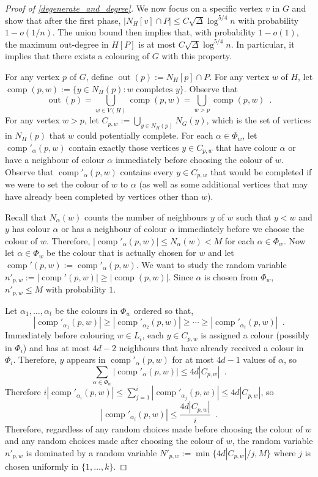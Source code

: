 \documentclass{patmorin}
\DeclareMathOperator{\outn}{out}
\DeclareMathOperator{\comp}{comp}
\begin{document}
\begin{proof}[Proof of \cref{degenerate_and_degree}]
  We now focus on a specific vertex $v$ in $G$ and show that after the first phase, $|N_{H}[v]\cap P|\le C\sqrt{\Delta}\log^{5/4} n$ with probability $1-o(1/n)$.  The union bound then implies that, with probability $1-o(1)$, the maximum out-degree in $H[P]$ is at most $C\sqrt{\Delta}\log^{5/4} n$.  In particular, it implies that there exists a colouring of $G$ with this property.

  For any vertex $p$ of $G$, define $\outn(p):=N_{H}[p]\cap P$. For any vertex $w$ of $H$, let $\comp(p,w):=\{y\in N_{H}(p):\text{$w$ completes $y$}\}$.  Observe that
  \[
    \outn(p) = \bigcup_{w\in V(H)} \comp(p,w) = \bigcup_{w>p} \comp(p,w) \enspace .
  \]
  For any vertex $w>p$, let $C_{p,w}:=\bigcup_{y\in N_{H}(p)} N_{G}(y)$, which is the set of vertices in $N_{H}(p)$ that $w$ could potentially complete.  For each $\alpha\in\Phi_w$, let $\comp'_\alpha(p,w)$ contain exactly those vertices $y\in C_{p,w}$ that have colour $\alpha$ or have a neighbour of colour $\alpha$ immediately before choosing the colour of $w$.  Observe that $\comp'_\alpha(p,w)$ contains every $y\in C_{p,w}$ that would be completed if we were to set the colour of $w$ to $\alpha$ (as well as some additional vertices that may have already been completed by vertices other than $w$).

  Recall that $N_\alpha(w)$ counts the number of neighbours $y$ of $w$ such that $y < w$ and $y$ has colour $\alpha$ or has a neighbour of colour $\alpha$ immediately before we choose the colour of $w$.  Therefore,  $|\comp'_\alpha(p,w)|\le N_\alpha(w)< M$ for each $\alpha\in\Phi_w$.  Now let $\alpha\in\Phi_w$ be the colour that is actually chosen for $w$ and let $\comp'(p,w):=\comp'_\alpha(p,w)$.  We want to study the random variable $n'_{p,w}:=|\comp'(p,w)|\ge |\comp(p,w)|$.  Since $\alpha$ is chosen from $\Phi_w$, $n'_{p,w}\le M$ with probability $1$.

  Let $\alpha_1,\ldots,\alpha_t$ be the colours in $\Phi_w$ ordered so that,
  \[
    |\comp'_{\alpha_1}(p,w)|\ge|\comp'_{\alpha_2}(p,w)|\ge\cdots\ge |\comp'_{\alpha_t}(p,w)| \enspace .
  \]
  Immediately before colouring $w\in L_i$, each $y\in C_{p,w}$ is assigned a colour (possibly in $\Phi_i$) and has at most $4d-2$ neighbours that have already received a colour in $\Phi_i$.  Therefore, $y$ appears in
  $\comp'_{\alpha}(p,w)$ for at most $4d-1$ values of $\alpha$, so
  \[
    \sum_{\alpha\in\Phi_w} |\comp'_{\alpha}(p,w)| \le 4d| C_{p,w}| \enspace .
  \]
  Therefore $i|\comp'_{\alpha_i}(p,w)|\le\sum_{j=1}^i|\comp'_{\alpha_j}(p,w)|\le 4d|C_{p,w}|$, so
  \[
    |\comp'_{\alpha_i}(p,w)|\le \frac{4d|C_{p,w}|}{i} \enspace .
  \]
  Therefore, regardless of any random choices made before choosing the colour of $w$ and any random choices made after choosing the colour of $w$, the random variable $n'_{p,w}$ is dominated by a random variable $N'_{p,w}:=\min\{4d|C_{p,w}|/j,M\}$ where $j$ is chosen uniformly in $\{1,\ldots,k\}$.


\end{proof}
\end{document}
